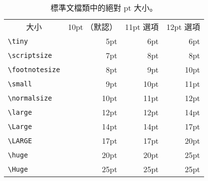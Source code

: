 \begin{table}[!tbp]
\caption{標準文檔類中的絕對 pt 大小。}\label{tab:pointsizes}
\label{tab:sizes}
\begin{lined}{12cm}
\begin{tabular}{lrrr}
\multicolumn{1}{c}{大小} &
\multicolumn{1}{c}{10pt （默認）} &
           \multicolumn{1}{c}{11pt 選項}  &
           \multicolumn{1}{c}{12pt 選項}\\
\verb|\tiny|       & 5pt  & 6pt & 6pt\\
\verb|\scriptsize| & 7pt  & 8pt & 8pt\\
\verb|\footnotesize| & 8pt & 9pt & 10pt \\
\verb|\small|        & 9pt & 10pt & 11pt \\
\verb|\normalsize| & 10pt & 11pt & 12pt \\
\verb|\large|      & 12pt & 12pt & 14pt \\
\verb|\Large|      & 14pt & 14pt & 17pt \\
\verb|\LARGE|      & 17pt & 17pt & 20pt\\
\verb|\huge|       & 20pt & 20pt & 25pt\\
\verb|\Huge|       & 25pt & 25pt & 25pt\\
\end{tabular}

\bigskip
\end{lined}
\end{table}


